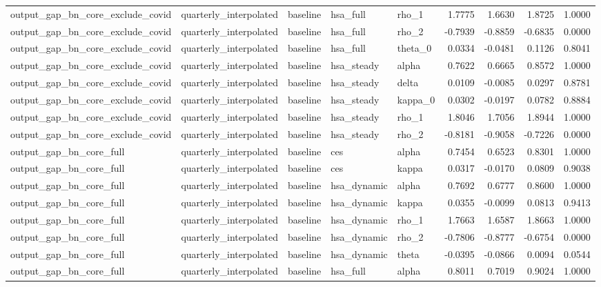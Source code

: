 \begin{tabular}{lllllrrrr}
output\_gap\_bn\_core\_exclude\_covid & quarterly\_interpolated & baseline & hsa\_full & rho\_1 & 1.7775 & 1.6630 & 1.8725 & 1.0000 \\
output\_gap\_bn\_core\_exclude\_covid & quarterly\_interpolated & baseline & hsa\_full & rho\_2 & -0.7939 & -0.8859 & -0.6835 & 0.0000 \\
output\_gap\_bn\_core\_exclude\_covid & quarterly\_interpolated & baseline & hsa\_full & theta\_0 & 0.0334 & -0.0481 & 0.1126 & 0.8041 \\
output\_gap\_bn\_core\_exclude\_covid & quarterly\_interpolated & baseline & hsa\_steady & alpha & 0.7622 & 0.6665 & 0.8572 & 1.0000 \\
output\_gap\_bn\_core\_exclude\_covid & quarterly\_interpolated & baseline & hsa\_steady & delta & 0.0109 & -0.0085 & 0.0297 & 0.8781 \\
output\_gap\_bn\_core\_exclude\_covid & quarterly\_interpolated & baseline & hsa\_steady & kappa\_0 & 0.0302 & -0.0197 & 0.0782 & 0.8884 \\
output\_gap\_bn\_core\_exclude\_covid & quarterly\_interpolated & baseline & hsa\_steady & rho\_1 & 1.8046 & 1.7056 & 1.8944 & 1.0000 \\
output\_gap\_bn\_core\_exclude\_covid & quarterly\_interpolated & baseline & hsa\_steady & rho\_2 & -0.8181 & -0.9058 & -0.7226 & 0.0000 \\
output\_gap\_bn\_core\_full & quarterly\_interpolated & baseline & ces & alpha & 0.7454 & 0.6523 & 0.8301 & 1.0000 \\
output\_gap\_bn\_core\_full & quarterly\_interpolated & baseline & ces & kappa & 0.0317 & -0.0170 & 0.0809 & 0.9038 \\
output\_gap\_bn\_core\_full & quarterly\_interpolated & baseline & hsa\_dynamic & alpha & 0.7692 & 0.6777 & 0.8600 & 1.0000 \\
output\_gap\_bn\_core\_full & quarterly\_interpolated & baseline & hsa\_dynamic & kappa & 0.0355 & -0.0099 & 0.0813 & 0.9413 \\
output\_gap\_bn\_core\_full & quarterly\_interpolated & baseline & hsa\_dynamic & rho\_1 & 1.7663 & 1.6587 & 1.8663 & 1.0000 \\
output\_gap\_bn\_core\_full & quarterly\_interpolated & baseline & hsa\_dynamic & rho\_2 & -0.7806 & -0.8777 & -0.6754 & 0.0000 \\
output\_gap\_bn\_core\_full & quarterly\_interpolated & baseline & hsa\_dynamic & theta & -0.0395 & -0.0866 & 0.0094 & 0.0544 \\
output\_gap\_bn\_core\_full & quarterly\_interpolated & baseline & hsa\_full & alpha & 0.8011 & 0.7019 & 0.9024 & 1.0000 \\

\end{tabular}
